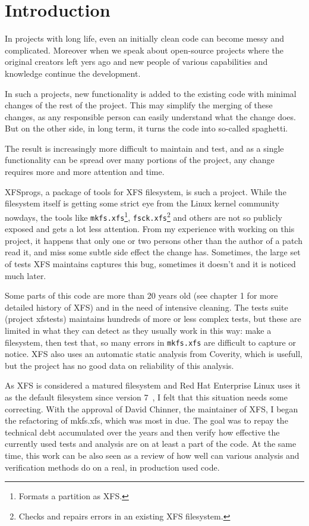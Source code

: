 
\chapter{Introduction}

In projects with long life, even an initially clean code can become messy and complicated. Moreover when we speak about open-source projects where the original creators left yers ago and new people of various capabilities and knowledge continue the development.

In such a projects, new functionality is added to the existing code with minimal changes of the rest of the project. This may simplify the merging of these changes, as any responsible person can easily understand what the change does. But on the other side, in long term, it turns the code into so-called spaghetti.

The result is increasingly more difficult to maintain and test, and as a single functionality can be spread over many portions of the project, any change requires more and more attention and time.

XFSprogs, a package of tools for XFS filesystem, is such a project. While the filesystem itself is getting some strict eye from the Linux kernel community nowdays, the tools like {\tt mkfs.xfs}\footnote{Formats a partition as XFS.}, {\tt fsck.xfs}\footnote{Checks and repairs errors in an existing XFS filesystem.} and others are not so publicly exposed and gets a lot less attention. From my experience with working on this project, it happens that only one or two persons other than the author of a patch read it, and miss some subtle side effect the change has. Sometimes, the large set of tests XFS maintains captures this bug, sometimes it doesn't and it is noticed much later.

Some parts of this code are more than 20 years old (see chapter 1 for more detailed history of XFS) and in the need of intensive cleaning. The tests suite (project xfstests) maintains hundreds of more or less complex tests, but these are limited in what they can detect as they usually work in this way: make a filesystem, then test that, so many errors in {\tt mkfs.xfs} are difficult to capture or notice. XFS also uses an automatic static analysis from Coverity, which is usefull, but the project has no good data on reliability of this analysis.

As XFS is considered a matured filesystem and Red Hat Enterprise Linux uses it as the default filesystem since version 7~\cite{RHEL7XFS}, I felt that this situation needs some correcting. With the approval of David Chinner, the maintainer of XFS, I began the refactoring of mkfs.xfs, which was most in due. The goal was to repay the technical debt accumulated over the years and then verify how effective the currently used tests and analysis are on at least a part of the code. At the same time, this work can be also seen as a review of how well can various analysis and verification methods do on a real, in production used code.

